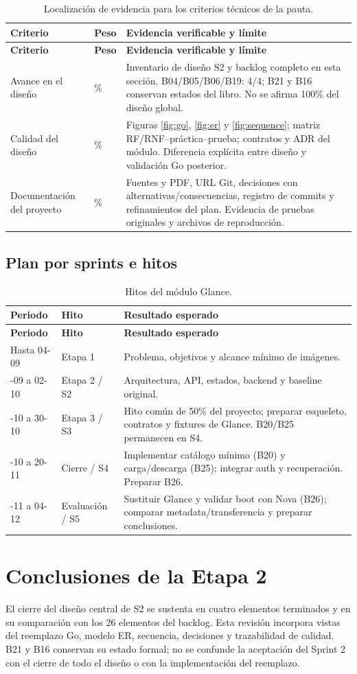 \documentclass[12pt,a4paper]{article}
\newcommand{\reporttable}[4]{\begingroup\small\setlength{\LTpre}{8pt}\setlength{\LTpost}{8pt}\setlength{\tabcolsep}{4pt}\renewcommand{\arraystretch}{1.15}
\begin{longtable}{#2}\caption{#1}\\\toprule #3\\\midrule\endfirsthead
\toprule #3\\\midrule\endhead\bottomrule\endfoot #4\end{longtable}\endgroup}
\begin{document}
\reporttable{Localización de evidencia para los criterios técnicos de la pauta.}{>{\raggedright\arraybackslash}p{4.2cm}>{\raggedright\arraybackslash}p{1.1cm}>{\raggedright\arraybackslash}p{9.4cm}}{\textbf{Criterio}&\textbf{Peso}&\textbf{Evidencia verificable y límite}}{
Avance en el diseño&10\%&Inventario de diseño S2 y backlog completo en esta sección. B04/B05/B06/B19: 4/4; B21 y B16 conservan estados del libro. No se afirma 100\% del diseño global.\\*
Calidad del diseño&55\%&Figuras \ref{fig:go}, \ref{fig:er} y \ref{fig:sequence}; matriz RF/RNF--práctica--prueba; contratos y ADR del módulo. Diferencia explícita entre diseño y validación Go posterior.\\*
Documentación del proyecto&15\%&Fuentes y PDF, URL Git, decisiones con alternativas/consecuencias, registro de commits y refinamientos del plan. Evidencia de pruebas originales y archivos de reproducción.\\}

\Needspace{240pt}
\subsection{Plan por sprints e hitos}
\reporttable{Hitos del módulo Glance.}{>{\raggedright\arraybackslash}p{3.2cm}>{\raggedright\arraybackslash}p{2.4cm}>{\raggedright\arraybackslash}p{9.4cm}}{\textbf{Periodo}&\textbf{Hito}&\textbf{Resultado esperado}}{
Hasta 04-09&Etapa 1&Problema, objetivos y alcance mínimo de imágenes.\\*
05-09 a 02-10&Etapa 2 / S2&Arquitectura, API, estados, backend y baseline original.\\*
03-10 a 30-10&Etapa 3 / S3&Hito común de 50\% del proyecto; preparar esqueleto, contratos y fixtures de Glance. B20/B25 permanecen en S4.\\*
31-10 a 20-11&Cierre / S4&Implementar catálogo mínimo (B20) y carga/descarga (B25); integrar auth y recuperación. Preparar B26.\\*
21-11 a 04-12&Evaluación / S5&Sustituir Glance y validar boot con Nova (B26); comparar metadata/transferencia y preparar conclusiones.\\}

\Needspace{320pt}
\section{Conclusiones de la Etapa 2}
El cierre del diseño central de S2 se sustenta en cuatro elementos terminados y en su comparación con los 26 elementos del backlog. Esta revisión incorpora vistas del reemplazo Go, modelo ER, secuencia, decisiones y trazabilidad de calidad. B21 y B16 conservan su estado formal; no se confunde la aceptación del Sprint 2 con el cierre de todo el diseño o con la implementación del reemplazo.
\end{document}

